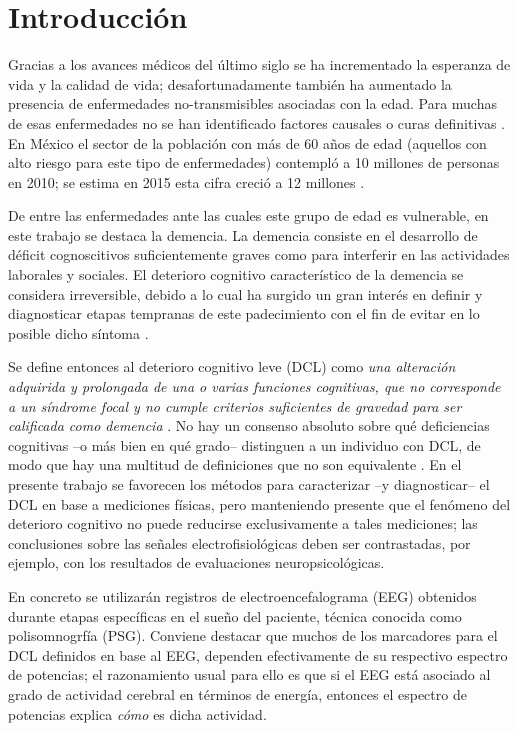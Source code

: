 
\chapter{Introducción}

Gracias a los avances médicos del último siglo se ha incrementado la esperanza de vida y la 
calidad de vida; desafortunadamente también ha aumentado la presencia de enfermedades 
no-transmisibles asociadas con la edad. 
%
Para muchas de esas enfermedades no se han identificado factores causales o curas definitivas 
\cite{PlanAlzheimer04}.
%
En México el sector de la población con más de 60 años de edad (aquellos con alto riesgo para este
tipo de enfermedades) contempló a 10 millones de personas en 2010; se estima en 2015 esta cifra 
creció a 12 millones \cite{Censo10,Intercensal15}.

De entre las enfermedades ante las cuales este grupo de edad es vulnerable, en este trabajo se 
destaca la demencia. 
%
La demencia consiste en el desarrollo de déficit cognoscitivos suficientemente graves como para 
interferir en las actividades laborales y sociales.
%
El deterioro cognitivo característico de la demencia se considera irreversible, debido a lo cual 
ha surgido un gran interés en definir y diagnosticar etapas tempranas de este padecimiento con el 
fin de evitar en lo posible dicho síntoma \cite{Knopman01}.

Se define entonces al deterioro cognitivo leve (DCL) como \textit{una alteración adquirida y 
prolongada de una o varias funciones cognitivas, que no corresponde a un síndrome focal y no cumple 
criterios suficientes de gravedad para ser calificada como demencia} \cite{Robles02}.
%
No hay un consenso absoluto sobre qué deficiencias cognitivas --o más bien en qué grado-- 
distinguen a un individuo con DCL, de modo que hay una multitud de definiciones que no son
equivalente \cite{Petersen01}.
%
En el presente trabajo se favorecen los métodos para caracterizar --y diagnosticar-- el DCL en base 
a mediciones físicas, pero manteniendo presente que el fenómeno del deterioro cognitivo no puede 
reducirse exclusivamente a tales mediciones; las conclusiones sobre las señales electrofisiológicas 
deben ser contrastadas, por ejemplo, con los resultados de evaluaciones neuropsicológicas.

En concreto se utilizarán registros de electroencefalograma (EEG) obtenidos durante etapas
específicas en el sueño del paciente, técnica conocida como polisomnogrfía (PSG).
%
Conviene destacar que muchos de los marcadores para el DCL definidos en base al EEG, dependen
efectivamente de su respectivo espectro de potencias; el razonamiento usual para ello es que si el 
EEG está asociado al grado de actividad cerebral en términos de energía, entonces el espectro de 
potencias explica \textit{cómo} es dicha actividad.

